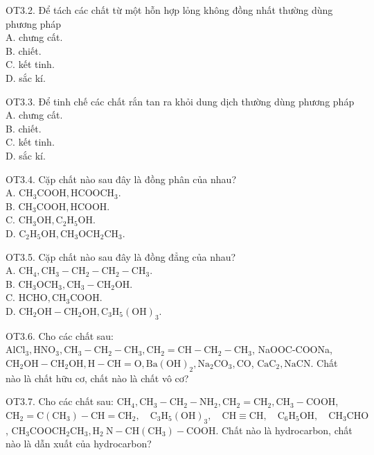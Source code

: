 \documentclass[10pt]{article}
\begin{document}
OT3.2. Để tách các chất từ một hỗn hợp lỏng không đồng nhất thường dùng phương pháp\\
A. chưng cất.\\
B. chiết.\\
C. kết tinh.\\
D. sắc kí.

OT3.3. Để tinh chế các chất rắn tan ra khỏi dung dịch thường dùng phương pháp\\
A. chưng cất.\\
B. chiết.\\
C. kết tinh.\\
D. sắc kí.

OT3.4. Cặp chất nào sau đây là đồng phân của nhau?\\
A. $\mathrm{CH}_{3} \mathrm{COOH}, \mathrm{HCOOCH}_{3}$.\\
B. $\mathrm{CH}_{3} \mathrm{COOH}, \mathrm{HCOOH}$.\\
C. $\mathrm{CH}_{3} \mathrm{OH}, \mathrm{C}_{2} \mathrm{H}_{5} \mathrm{OH}$.\\
D. $\mathrm{C}_{2} \mathrm{H}_{5} \mathrm{OH}, \mathrm{CH}_{3} \mathrm{OCH}_{2} \mathrm{CH}_{3}$.

OT3.5. Cặp chất nào sau đây là đồng đẳng của nhau?\\
A. $\mathrm{CH}_{4}, \mathrm{CH}_{3}-\mathrm{CH}_{2}-\mathrm{CH}_{2}-\mathrm{CH}_{3}$.\\
B. $\mathrm{CH}_{3} \mathrm{OCH}_{3}, \mathrm{CH}_{3}-\mathrm{CH}_{2} \mathrm{OH}$.\\
C. $\mathrm{HCHO}, \mathrm{CH}_{3} \mathrm{COOH}$.\\
D. $\mathrm{CH}_{2} \mathrm{OH}-\mathrm{CH}_{2} \mathrm{OH}, \mathrm{C}_{3} \mathrm{H}_{5}(\mathrm{OH})_{3}$.

OT3.6. Cho các chất sau: $\mathrm{AlCl}_{3}, \mathrm{HNO}_{3}, \mathrm{CH}_{3}-\mathrm{CH}_{2}-\mathrm{CH}_{3}, \mathrm{CH}_{2}=\mathrm{CH}-\mathrm{CH}_{2}-\mathrm{CH}_{3}$, NaOOC-COONa, $\mathrm{CH}_{2} \mathrm{OH}-\mathrm{CH}_{2} \mathrm{OH}, \mathrm{H}-\mathrm{CH}=\mathrm{O}, \mathrm{Ba}(\mathrm{OH})_{2}, \mathrm{Na}_{2} \mathrm{CO}_{3}, \mathrm{CO}$, $\mathrm{CaC}_{2}, \mathrm{NaCN}$. Chất nào là chất hữu cơ, chất nào là chất vô cơ?

OT3.7. Cho các chất sau: $\mathrm{CH}_{4}, \mathrm{CH}_{3}-\mathrm{CH}_{2}-\mathrm{NH}_{2}, \mathrm{CH}_{2}=\mathrm{CH}_{2}, \mathrm{CH}_{3}-\mathrm{COOH}$, $\mathrm{CH}_{2}=\mathrm{C}\left(\mathrm{CH}_{3}\right)-\mathrm{CH}=\mathrm{CH}_{2}, \quad \mathrm{C}_{3} \mathrm{H}_{5}(\mathrm{OH})_{3}, \quad \mathrm{CH} \equiv \mathrm{CH}, \quad \mathrm{C}_{6} \mathrm{H}_{5} \mathrm{OH}, \quad \mathrm{CH}_{3} \mathrm{CHO}$, $\mathrm{CH}_{3} \mathrm{COOCH}_{2} \mathrm{CH}_{3}, \mathrm{H}_{2} \mathrm{~N}-\mathrm{CH}\left(\mathrm{CH}_{3}\right)-\mathrm{COOH}$. Chất nào là hydrocarbon, chất nào là dẫn xuất của hydrocarbon?
\end{document}
